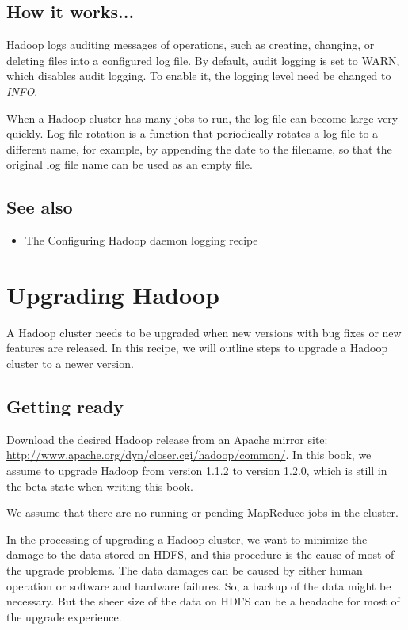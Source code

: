 \subsection*{How it works...}
Hadoop logs auditing messages of operations, such as creating, changing, or deleting files into a configured log file. By default, audit logging is set to WARN, which disables audit logging. To enable it, the logging level need be changed to \emph{INFO}.

When a Hadoop cluster has many jobs to run, the log file can become large very quickly. Log file rotation is a function that periodically rotates a log file to a different name, for example, by appending the date to the filename, so that the original log file name can be used as an empty file.
\subsection*{See also}
\begin{itemize}
  \item The Configuring Hadoop daemon logging recipe
\end{itemize}

\section{Upgrading Hadoop}
A Hadoop cluster needs to be upgraded when new versions with bug fixes or new features are released. In this recipe, we will outline steps to upgrade a Hadoop cluster to a newer version.

\subsection*{Getting ready}
Download the desired Hadoop release from an Apache mirror site: \url{http://www.apache.org/dyn/closer.cgi/hadoop/common/}. In this book, we assume to upgrade Hadoop from version 1.1.2 to version 1.2.0, which is still in the beta state when writing this book.

We assume that there are no running or pending MapReduce jobs in the cluster.

In the processing of upgrading a Hadoop cluster, we want to minimize the damage to the data stored on HDFS, and this procedure is the cause of most of the upgrade problems. The data damages can be caused by either human operation or software and hardware failures. So, a backup of the data might be necessary. But the sheer size of the data on HDFS can be a headache for most of the upgrade experience.

